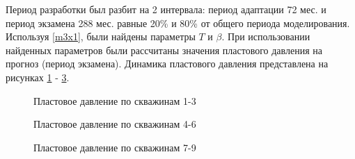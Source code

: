\documentclass[14pt]{article}
\begin{document}
Период разработки был разбит на 2 интервала: период адаптации 72 мес. и период экзамена 288 мес. равные 20\% и 80\% от общего периода моделирования. Используя \ref{m3x1}, были найдены параметры $T$ и $\beta$. При использовании найденных параметров были рассчитаны значения пластового давления на прогноз (период экзамена). Динамика пластового давления представлена на рисунках \ref{fig:3.1_3} - \ref{fig:3.7_9}.
	
	\begin{figure}[h]
		\caption{Пластовое давление по скважинам 1-3}
		\label{fig:3.1_3}
	\end{figure}

	\begin{figure}[h]
		\caption{Пластовое давление по скважинам 4-6}
		\label{fig:3.4_6}
	\end{figure}

	\begin{figure}[h]
		\caption{Пластовое давление по скважинам 7-9}
		\label{fig:3.7_9}
	\end{figure}
	
\end{document}
